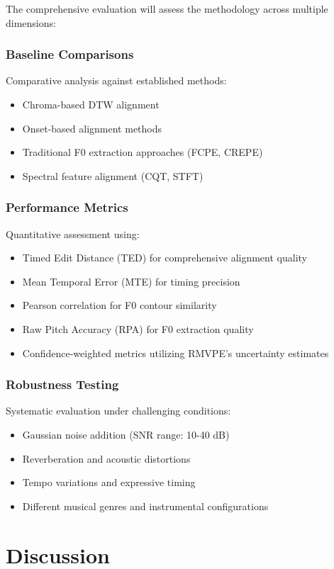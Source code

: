 \documentclass[12pt,a4paper]{article}
\begin{document}
The comprehensive evaluation will assess the methodology across multiple dimensions:

\subsubsection{Baseline Comparisons}
Comparative analysis against established methods:
\begin{itemize}
    \item Chroma-based DTW alignment
    \item Onset-based alignment methods
    \item Traditional F0 extraction approaches (FCPE, CREPE)
    \item Spectral feature alignment (CQT, STFT)
\end{itemize}

\subsubsection{Performance Metrics}
Quantitative assessment using:
\begin{itemize}
    \item Timed Edit Distance (TED) for comprehensive alignment quality
    \item Mean Temporal Error (MTE) for timing precision
    \item Pearson correlation for F0 contour similarity
    \item Raw Pitch Accuracy (RPA) for F0 extraction quality
    \item Confidence-weighted metrics utilizing RMVPE's uncertainty estimates
\end{itemize}

\subsubsection{Robustness Testing}
Systematic evaluation under challenging conditions:
\begin{itemize}
    \item Gaussian noise addition (SNR range: 10-40 dB)
    \item Reverberation and acoustic distortions
    \item Tempo variations and expressive timing
    \item Different musical genres and instrumental configurations
\end{itemize}

\section{Discussion}
\label{sec:discussao}
\end{document}
